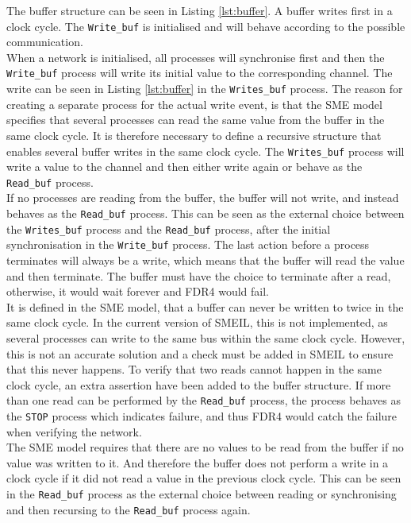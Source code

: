 The buffer structure can be seen in Listing \ref{lst:buffer}.
A buffer writes first in a clock cycle. The \texttt{Write\_buf} is initialised and will behave according to the possible communication.\\

When a network is initialised, all processes will synchronise first and then the \texttt{Write\_buf} process will write its initial value to the corresponding channel. The write can be seen in Listing \ref{lst:buffer} in the \texttt{Writes\_buf} process. The reason for creating a separate process for the actual write event, is that the SME model specifies that several processes can read the same value from the buffer in the same clock cycle. It is therefore necessary to define a recursive structure that enables several buffer writes in the same clock cycle. The \texttt{Writes\_buf} process will write a value to the channel and then either write again or behave as the \texttt{Read\_buf} process.\\

If no processes are reading from the buffer, the buffer will not write, and instead behaves as the \texttt{Read\_buf} process. This can be seen as the external choice between the \texttt{Writes\_buf} process and the \texttt{Read\_buf} process, after the initial synchronisation in the \texttt{Write\_buf} process.
The last action before a process terminates will always be a write, which means that the buffer will read the value and then terminate. The buffer must have the choice to terminate after a read, otherwise, it would wait forever and FDR4 would fail. \\

It is defined in the SME model, that a buffer can never be written to twice in the same clock cycle. In the current version of SMEIL, this is not implemented, as several processes can write to the same bus within the same clock cycle. However, this is not an accurate solution and a check must be added in SMEIL to ensure that this never happens. To verify that two reads cannot happen in the same clock cycle, an extra assertion have been added to the buffer structure.
If more than one read can be performed by the \texttt{Read\_buf} process, the process behaves as the \texttt{STOP} process which indicates failure, and thus FDR4 would catch the failure when verifying the network.\\

The SME model requires that there are no values to be read from the buffer if no value was written to it. And therefore the buffer does not perform a write in a clock cycle if it did not read a value in the previous clock cycle. This can be seen in the \texttt{Read\_buf} process as the external choice between reading or synchronising and then recursing to the \texttt{Read\_buf} process again.\\

